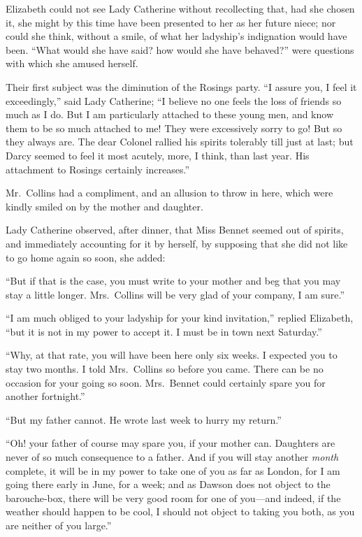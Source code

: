 Elizabeth could not see Lady Catherine without recollecting that,
had she chosen it, she might by this time have been presented to
her as her future niece; nor could she think, without a smile, of
what her ladyship's indignation would have been.  ``What would
she have said? how would she have behaved?'' were questions with
which she amused herself.

Their first subject was the diminution of the Rosings party.
``I assure you, I feel it exceedingly,'' said Lady Catherine; ``I
believe no one feels the loss of friends so much as I do.  But
I am particularly attached to these young men, and know them to
be so much attached to me!  They were excessively sorry to go!
But so they always are.  The dear Colonel rallied his spirits
tolerably till just at last; but Darcy seemed to feel it most
acutely, more, I think, than last year.  His attachment to
Rosings certainly increases.''

Mr.\ Collins had a compliment, and an allusion to throw in here,
which were kindly smiled on by the mother and daughter.

Lady Catherine observed, after dinner, that Miss Bennet seemed
out of spirits, and immediately accounting for it by herself,
by supposing that she did not like to go home again so soon,
she added:

``But if that is the case, you must write to your mother and beg
that you may stay a little longer.  Mrs.\ Collins will be very glad
of your company, I am sure.''

``I am much obliged to your ladyship for your kind invitation,''
replied Elizabeth, ``but it is not in my power to accept it.
I must be in town next Saturday.''

``Why, at that rate, you will have been here only six weeks.  I
expected you to stay two months.  I told Mrs.\ Collins so before
you came.  There can be no occasion for your going so soon.
Mrs.\ Bennet could certainly spare you for another fortnight.''

``But my father cannot.  He wrote last week to hurry my return.''

``Oh! your father of course may spare you, if your mother can.
Daughters are never of so much consequence to a father.  And if
you will stay another \emph{month} complete, it will be in my power
to take one of you as far as London, for I am going there early
in June, for a week; and as Dawson does not object to the
barouche-box, there will be very good room for one of you---and
indeed, if the weather should happen to be cool, I should not
object to taking you both, as you are neither of you large.''

